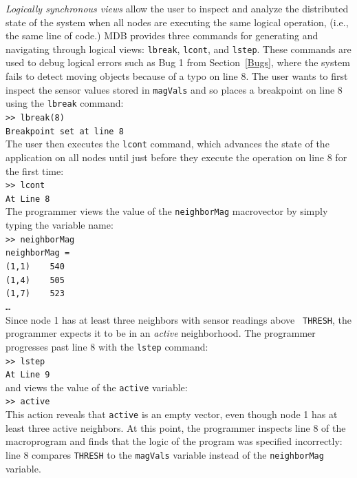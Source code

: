 \emph{Logically synchronous views} allow the user to inspect and analyze the
distributed state of the system when all nodes are executing the same logical
operation, (i.e., the same line of code.)  MDB provides three commands for
generating and navigating through logical views: {\tt lbreak}, {\tt lcont}, and
{\tt lstep}.  These commands are used to debug logical errors such as Bug 1 from
Section~\ref{Bugs}, where the system fails to detect moving objects because of a
typo on line 8.  The user wants to first inspect the sensor values stored in
{\tt magVals} and so places a breakpoint on line 8 using the {\tt lbreak}
command: \\ {\small\tt\indent >> lbreak(8)}\\ {\small\tt\indent Breakpoint set
at
line 8}\\
The user then executes the {\tt lcont} command, which advances the state of the
application on all nodes until just before they execute the operation on line 8
for the first time:
\\ {\small\tt\indent >> lcont}\\
{\small\indent\tt At Line 8}\\
The programmer views the value of the {\tt neighborMag} macrovector by simply
typing
the variable name:\\
{\small\tt\indent >> neighborMag}\\
{\small\tt\indent neighborMag =}\\
{\small\tt\indent\indent(1,1)~~~~540}\\
{\small\tt\indent\indent(1,4)~~~~505}\\
{\small\tt\indent\indent(1,7)~~~~523}\\
{\small\tt\indent\indent\ldots}\\
Since node 1 has at least three neighbors with sensor readings above {\tt
THRESH}, the programmer expects it to be in an {\em active} neighborhood.
The programmer progresses past line 8 with the {\tt lstep} command: \\
{\small\tt\indent >> lstep}\\
{\small\indent\tt At Line 9}\\
and views the value of the {\tt active} variable:\\
{\tt\small\indent >> active}\\
This action reveals that {\tt active} is an empty vector, even though node 1 has
at least three active neighbors.  At this point, the programmer inspects line 8
of the macroprogram and finds that the logic of the program was specified
incorrectly: line 8 compares {\tt THRESH} to the {\tt magVals} variable instead
of the {\tt neighborMag} variable.

